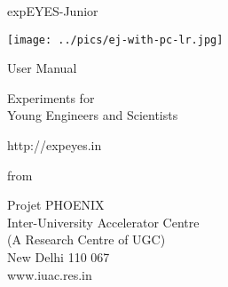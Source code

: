 \documentclass[12pt,a4paper]{report}
\begin{document}
\begin{titlepage}
\thispagestyle{empty}

\vspace{0.2in}

\begin{center}
{\Huge{}expEYES-Junior}
\par\end{center}{\Huge \par}

\begin{center}
\texttt{[image: ../pics/ej-with-pc-lr.jpg]}
\par\end{center}

\begin{center}
{\large{}User Manual }
\par\end{center}{\large \par}

\begin{center}
{\LARGE{} Experiments for}\\
{\LARGE{} Young Engineers and Scientists}
\par\end{center}{\LARGE \par}

\begin{center}
http://expeyes.in
\par\end{center}

\begin{center}
from
\par\end{center}

\begin{center}
Projet PHOENIX\\
Inter-University Accelerator Centre \\
(A Research Centre of UGC)\\
New Delhi 110 067\\
www.iuac.res.in
\par\end{center}

\end{titlepage}
\end{document}
